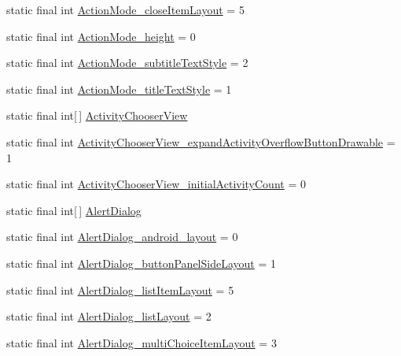 \begin{CompactItemize}
\item 
static final int \hyperlink{classandroid_1_1support_1_1v4_1_1_r_1_1styleable_a4f076d47f79c0b695b050ccd1d9089e}{ActionMode\_\-closeItemLayout} = 5
\item 
static final int \hyperlink{classandroid_1_1support_1_1v4_1_1_r_1_1styleable_bc09ebbb71fe7090cc37b98f82c34647}{ActionMode\_\-height} = 0
\item 
static final int \hyperlink{classandroid_1_1support_1_1v4_1_1_r_1_1styleable_8f8b0c324c58b0dcb3f7272911eb5365}{ActionMode\_\-subtitleTextStyle} = 2
\item 
static final int \hyperlink{classandroid_1_1support_1_1v4_1_1_r_1_1styleable_93a05f44280c1708d5a6f3d307415600}{ActionMode\_\-titleTextStyle} = 1
\item 
static final int\mbox{[}$\,$\mbox{]} \hyperlink{classandroid_1_1support_1_1v4_1_1_r_1_1styleable_8ebac440352ca658a6c7d0b99e1eb8da}{ActivityChooserView}
\item 
static final int \hyperlink{classandroid_1_1support_1_1v4_1_1_r_1_1styleable_912d1bd867727cff83bd6c5fb2f6ffd3}{ActivityChooserView\_\-expandActivityOverflowButtonDrawable} = 1
\item 
static final int \hyperlink{classandroid_1_1support_1_1v4_1_1_r_1_1styleable_1bbab56b57a1d4dbf1b6419979ba355b}{ActivityChooserView\_\-initialActivityCount} = 0
\item 
static final int\mbox{[}$\,$\mbox{]} \hyperlink{classandroid_1_1support_1_1v4_1_1_r_1_1styleable_984adead369fc9c6b58c85f88690832f}{AlertDialog}
\item 
static final int \hyperlink{classandroid_1_1support_1_1v4_1_1_r_1_1styleable_705bd8f65b9cad04ffe647abf449892c}{AlertDialog\_\-android\_\-layout} = 0
\item 
static final int \hyperlink{classandroid_1_1support_1_1v4_1_1_r_1_1styleable_5035a6dc698e70cff680cbf999f76b5c}{AlertDialog\_\-buttonPanelSideLayout} = 1
\item 
static final int \hyperlink{classandroid_1_1support_1_1v4_1_1_r_1_1styleable_428eb36452bd3ec51c37fc80329506b7}{AlertDialog\_\-listItemLayout} = 5
\item 
static final int \hyperlink{classandroid_1_1support_1_1v4_1_1_r_1_1styleable_0403be32bcf503a2c849b039a63da598}{AlertDialog\_\-listLayout} = 2
\item 
static final int \hyperlink{classandroid_1_1support_1_1v4_1_1_r_1_1styleable_c064dc58d9cc15c073b7697e72f46058}{AlertDialog\_\-multiChoiceItemLayout} = 3
\item 

\end{CompactItemize}
